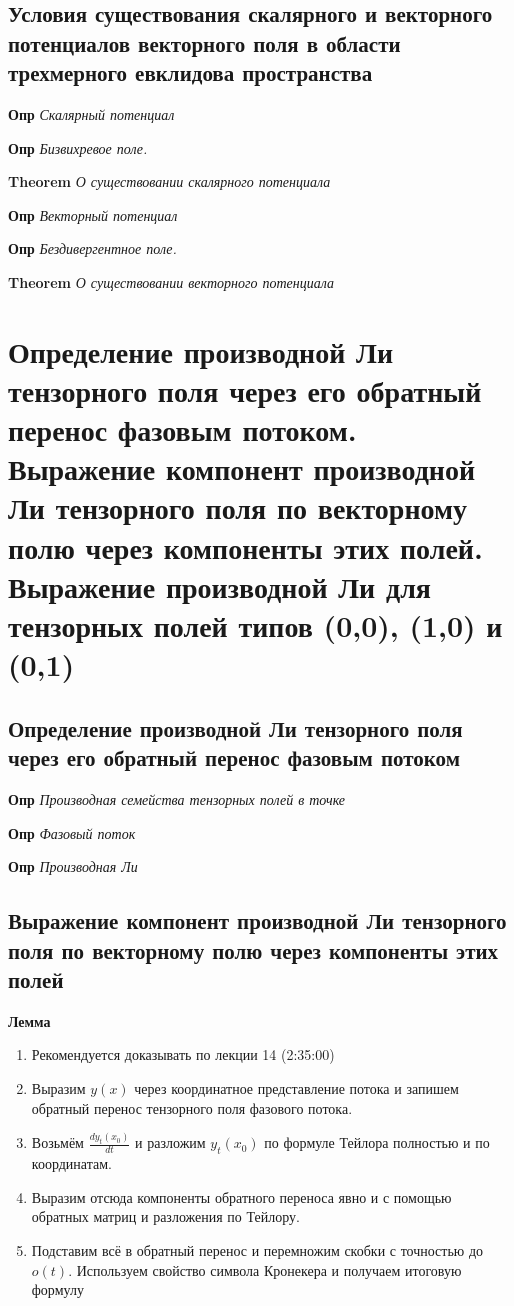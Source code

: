 \documentclass[a4paper, 14pt]{article}
\begin{document}
    \subsection{Условия существования скалярного и векторного потенциалов векторного поля в области трехмерного
    евклидова пространства}
    
    \textbf{Опр} \textit{Скалярный потенциал}
    
    \textbf{Опр} \textit{Бизвихревое поле.}
    
    \textbf{Theorem} \textit{О существовании скалярного потенциала}
    
    \textbf{Опр} \textit{Векторный потенциал}
    
    \textbf{Опр} \textit{Бездивергентное поле.}
    
    \textbf{Theorem} \textit{О существовании векторного потенциала}
    
    \section{Определение производной Ли тензорного поля через его обратный перенос фазовым потоком.
    Выражение компонент производной Ли тензорного поля по векторному полю через компоненты этих полей.
    Выражение производной Ли для тензорных полей типов (0,0), (1,0) и (0,1)}
    
    \subsection{Определение производной Ли тензорного поля через его обратный перенос фазовым потоком}
    
    \textbf{Опр} \textit{Производная семейства тензорных полей в точке}
    
    \textbf{Опр} \textit{Фазовый поток}
    
    \textbf{Опр} \textit{Производная Ли}
    
    \subsection{Выражение компонент производной Ли тензорного поля по векторному полю через компоненты этих полей}
    
    \textbf{Лемма}
    
    \begin{enumerate}
        \item Рекомендуется доказывать по лекции 14 (2:35:00)
        \item Выразим $y(x)$ через координатное представление потока и запишем обратный перенос тензорного поля
        фазового потока.
        \item Возьмём $\frac{d y_t (x_0)}{dt}$ и разложим $y_t (x_0)$ по формуле Тейлора полностью и по координатам.
        \item Выразим отсюда компоненты обратного переноса явно и с помощью обратных матриц и разложения по Тейлору.
        \item Подставим всё в обратный перенос и перемножим скобки с точностью до $o(t)$.
        Используем свойство символа Кронекера и получаем итоговую формулу
    \end{enumerate}
    
\end{document}
